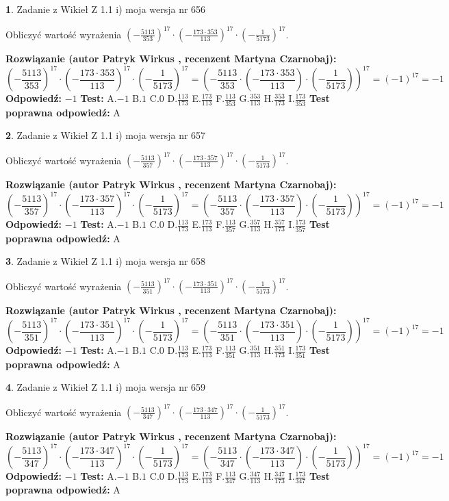 \documentclass[12pt, a4paper]{article}
\theoremstyle{definition} %
\newtheorem{zad}{}
\newcommand{\zadStart}[1]{\begin{zad}#1\newline}
\newcommand{\zadStop}{\end{zad}}
\newcommand{\rozwStart}[2]{\noindent \textbf{Rozwiązanie (autor #1 , recenzent #2): }\newline}
\newcommand{\rozwStop}{\newline}
\newcommand{\odpStart}{\noindent \textbf{Odpowiedź:}\newline}
\newcommand{\odpStop}{\newline}
\newcommand{\testStart}{\noindent \textbf{Test:}\newline}
\newcommand{\testStop}{\newline}
\newcommand{\kluczStart}{\noindent \textbf{Test poprawna odpowiedź:}\newline}
\newcommand{\kluczStop}{\newline}
\begin{document}
\zadStart{Zadanie z Wikieł Z 1.1 i) moja wersja nr 656}

Obliczyć wartość wyrażenia $(-\frac{5113}{353})^{17} \cdot (-\frac{173 \cdot 353}{113})^{17} \cdot (-\frac{1}{5173})^{17}$.
\zadStop
\rozwStart{Patryk Wirkus}{Martyna Czarnobaj}
$$(-\frac{5113}{353})^{17} \cdot (-\frac{173 \cdot 353}{113})^{17} \cdot (-\frac{1}{5173})^{17} = (-\frac{5113}{353} \cdot (-\frac{173 \cdot 353}{113}) \cdot (-\frac{1}{5173}))^{17} = (-1)^{17} = -1$$
\rozwStop
\odpStart
$-1$
\odpStop
\testStart
A.$-1$ B.$1$ C.$0$ D.$\frac{113}{173}$ E.$\frac{173}{113}$
F.$\frac{113}{353}$ G.$\frac{353}{113}$
H.$\frac{353}{173}$
I.$\frac{173}{353}$
\testStop
\kluczStart
A
\kluczStop



\zadStart{Zadanie z Wikieł Z 1.1 i) moja wersja nr 657}

Obliczyć wartość wyrażenia $(-\frac{5113}{357})^{17} \cdot (-\frac{173 \cdot 357}{113})^{17} \cdot (-\frac{1}{5173})^{17}$.
\zadStop
\rozwStart{Patryk Wirkus}{Martyna Czarnobaj}
$$(-\frac{5113}{357})^{17} \cdot (-\frac{173 \cdot 357}{113})^{17} \cdot (-\frac{1}{5173})^{17} = (-\frac{5113}{357} \cdot (-\frac{173 \cdot 357}{113}) \cdot (-\frac{1}{5173}))^{17} = (-1)^{17} = -1$$
\rozwStop
\odpStart
$-1$
\odpStop
\testStart
A.$-1$ B.$1$ C.$0$ D.$\frac{113}{173}$ E.$\frac{173}{113}$
F.$\frac{113}{357}$ G.$\frac{357}{113}$
H.$\frac{357}{173}$
I.$\frac{173}{357}$
\testStop
\kluczStart
A
\kluczStop



\zadStart{Zadanie z Wikieł Z 1.1 i) moja wersja nr 658}

Obliczyć wartość wyrażenia $(-\frac{5113}{351})^{17} \cdot (-\frac{173 \cdot 351}{113})^{17} \cdot (-\frac{1}{5173})^{17}$.
\zadStop
\rozwStart{Patryk Wirkus}{Martyna Czarnobaj}
$$(-\frac{5113}{351})^{17} \cdot (-\frac{173 \cdot 351}{113})^{17} \cdot (-\frac{1}{5173})^{17} = (-\frac{5113}{351} \cdot (-\frac{173 \cdot 351}{113}) \cdot (-\frac{1}{5173}))^{17} = (-1)^{17} = -1$$
\rozwStop
\odpStart
$-1$
\odpStop
\testStart
A.$-1$ B.$1$ C.$0$ D.$\frac{113}{173}$ E.$\frac{173}{113}$
F.$\frac{113}{351}$ G.$\frac{351}{113}$
H.$\frac{351}{173}$
I.$\frac{173}{351}$
\testStop
\kluczStart
A
\kluczStop



\zadStart{Zadanie z Wikieł Z 1.1 i) moja wersja nr 659}

Obliczyć wartość wyrażenia $(-\frac{5113}{347})^{17} \cdot (-\frac{173 \cdot 347}{113})^{17} \cdot (-\frac{1}{5173})^{17}$.
\zadStop
\rozwStart{Patryk Wirkus}{Martyna Czarnobaj}
$$(-\frac{5113}{347})^{17} \cdot (-\frac{173 \cdot 347}{113})^{17} \cdot (-\frac{1}{5173})^{17} = (-\frac{5113}{347} \cdot (-\frac{173 \cdot 347}{113}) \cdot (-\frac{1}{5173}))^{17} = (-1)^{17} = -1$$
\rozwStop
\odpStart
$-1$
\odpStop
\testStart
A.$-1$ B.$1$ C.$0$ D.$\frac{113}{173}$ E.$\frac{173}{113}$
F.$\frac{113}{347}$ G.$\frac{347}{113}$
H.$\frac{347}{173}$
I.$\frac{173}{347}$
\testStop
\kluczStart
A
\kluczStop
\end{document}
